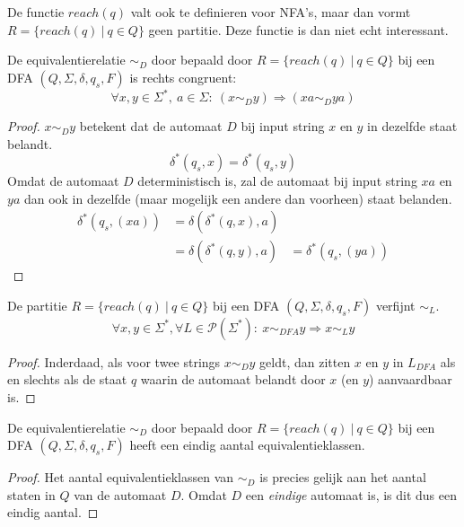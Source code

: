 \documentclass[main.tex]{subfiles}
\begin{document}
\begin{opm}
  De functie $reach(q)$ valt ook te definieren voor NFA's, maar dan vormt $R = \{ reach(q)\ |\ q \in Q \}$ geen partitie.
  Deze functie is dan niet echt interessant.
\end{opm}

\begin{ei}
  \label{ei:sim-dfa-rechts-congruent}
  De equivalentierelatie $\sim_{D}$ door bepaald door $R = \{ reach(q)\ |\ q \in Q \}$ bij een DFA $(Q,\Sigma,\delta,q_{s},F)$ is rechts congruent:
  \[ \forall x,y \in \Sigma^{*},\ a \in \Sigma:\ (x \sim_{D} y) \Rightarrow (xa \sim_{D} ya) \]
  \begin{proof}
    $x \sim_{D} y$ betekent dat de automaat $D$ bij input string $x$ en $y$ in dezelfde staat belandt.
    \[ \delta^{*}(q_{s},x) = \delta^{*}(q_{s},y) \]
    Omdat de automaat $D$ deterministisch is, zal de automaat bij input string $xa$ en $ya$ dan ook in dezelfde (maar mogelijk een andere dan voorheen) staat belanden.
    \[
    \begin{array}{rll}
      \delta^{*}(q_{s},(xa)) &= \delta(\delta^{*}(q,x),a) &\\
      &= \delta(\delta^{*}(q,y),a) &= \delta^{*}(q_{s},(ya))
    \end{array}
    \]
  \end{proof}
\end{ei}

\begin{ei}
  \label{ei:sim-dfa-verfijnt-sim-l}
  De partitie $R = \{ reach(q)\ |\ q \in Q \}$ bij een DFA $(Q,\Sigma,\delta,q_{s},F)$ verfijnt $\sim_{L}$.
  \[ \forall x,y \in \Sigma^{*}, \forall L\in \mathcal{P}(\Sigma^{*}):\ x \sim_{DFA} y \Rightarrow x \sim_{L} y\]
  \begin{proof}
    Inderdaad, als voor twee strings $x \sim_{D} y$ geldt, dan zitten $x$ en $y$ in $L_{DFA}$ als en slechts als de staat $q$ waarin de automaat belandt door $x$ (en $y$) aanvaardbaar is.
  \end{proof}
\end{ei}

\begin{ei}
  \label{ei:sim-dfa-eindig-aantal-equivalentieklassen}
  De equivalentierelatie $\sim_{D}$ door bepaald door $R = \{ reach(q)\ |\ q \in Q \}$ bij een DFA $(Q,\Sigma,\delta,q_{s},F)$ heeft een eindig aantal equivalentieklassen.
  \begin{proof}
    Het aantal equivalentieklassen van $\sim_{D}$ is precies gelijk aan het aantal staten in $Q$ van de automaat $D$. Omdat $D$ een \emph{eindige} automaat is, is dit dus een eindig aantal.
  \end{proof}
\end{ei}
\end{document}

